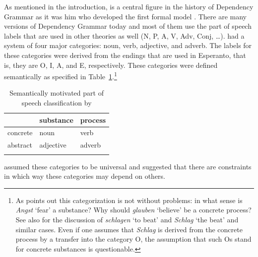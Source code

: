 As mentioned in the introduction, \tes is a central figure in the history of Dependency Grammar
as it was him who developed the first formal model \citep{Tesniere59a-u,Tesniere80a-u,Tesniere2015a-u}. There are many versions
of Dependency Grammar today and most of them use the part of speech labels that are used in other
theories as well (N, P, A, V, Adv, Conj, \ldots). \tes had a system of four major categories: noun,
verb, adjective, and adverb. The labels for these categories were derived from the endings that are
used in Esperanto, that is, they are O, I, A, and E, respectively. These categories
were defined semantically as specified in Table~\ref{table-pos-tesniere}.\footnote{%
  As 
\citet[]{Weber97a} points out this categorization is not without problems: in what
  sense is \emph{Angst} `fear' a substance? Why should \emph{glauben} `believe' be a concrete
  process? See also \citet[Section~3.4]{Klein71a-u} for the discussion of \emph{schlagen} `to beat' and
  \emph{Schlag} `the beat' and similar cases. Even if one assumes that \emph{Schlag} is derived from
  the concrete process  by a transfer into the category O, the assumption that such
  Os stand for concrete substances is questionable.
}
\begin{table}[t]
\begin{tabular}{lll}
\lsptoprule
         & substance & process\\
\midrule
concrete & noun & verb \\
abstract & adjective & adverb\\
\lspbottomrule
\end{tabular}
\caption{\label{table-pos-tesniere}Semantically motivated part of speech classification by \tes}
\end{table}%
\tes assumed these categories to be universal and suggested that there are constraints in which way these categories may
depend on others.

